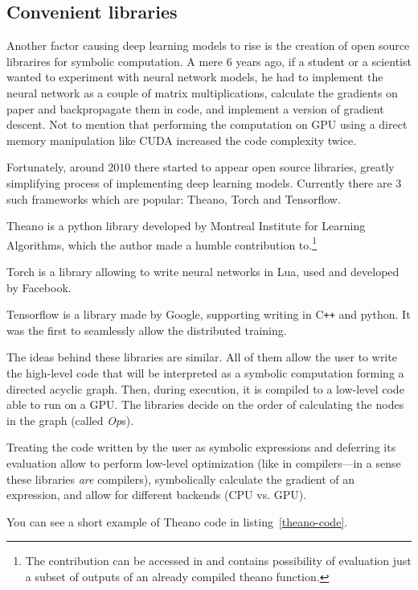 \subsection{Convenient libraries}
Another factor causing deep learning models to rise is the creation of open source librarires for symbolic computation. A mere $6$ years ago, if a student or a scientist wanted to experiment with neural network models, he had to implement the neural network as a couple of matrix multiplications, calculate the gradients on paper and backpropagate them in code, and implement a version of gradient descent. Not to mention that performing the computation on GPU using a direct memory manipulation like CUDA increased the code complexity twice.

Fortunately, around $2010$ there started to appear open source libraries, greatly simplifying process of implementing deep learning models. Currently there are $3$ such frameworks which are popular: Theano, Torch and Tensorflow.

Theano \cite{theano} is a python library developed by Montreal Institute for Learning Algorithms, which the author made a humble contribution to.\footnote{The contribution can be accessed in \cite{theano-contrib} and contains possibility of evaluation just a subset of outputs of an already compiled theano function.}

Torch \cite{torch} is a library allowing to write neural networks in Lua, used and developed by Facebook.

Tensorflow \cite{tensorflow} is a library made by Google, supporting writing in C\texttt{++} and python. It was the first to seamlessly allow the distributed training.

The ideas behind these libraries are similar. All of them allow the user to write the high-level code that will be interpreted as a symbolic computation forming a directed acyclic graph. Then, during execution, it is compiled to a low-level code able to run on a GPU. The libraries decide on the order of calculating the nodes in the graph (called \emph{Op}s).

Treating the code written by the user as symbolic expressions and deferring its evaluation allow to perform low-level optimization (like in compilers---in a sense these libraries \textit{are} compilers), symbolically calculate the gradient of an expression, and allow for different backends (CPU vs. GPU).

You can see a short example of Theano code in listing~\ref{theano-code}.

